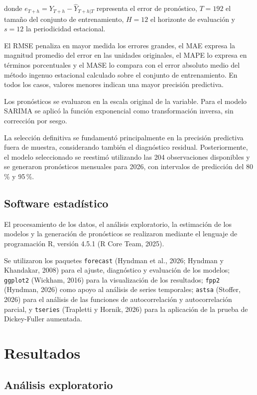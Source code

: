 \documentclass[12pt]{article}
\begin{document}
donde $e_{T+h}=Y_{T+h}-\widehat{Y}_{T+h|T}$ representa 
el error de pronóstico, $T=192$ el tamaño del conjunto 
de entrenamiento, $H=12$ el horizonte de evaluación 
y $s=12$ la periodicidad estacional.

El RMSE penaliza en mayor medida los errores grandes, 
el MAE expresa la magnitud promedio del error en las 
unidades originales, el MAPE lo expresa en términos 
porcentuales y el MASE lo compara con el error absoluto 
medio del método ingenuo estacional calculado sobre 
el conjunto de entrenamiento. En todos los casos, 
valores menores indican una mayor precisión predictiva.

Los pronósticos se evaluaron en la escala original 
de la variable. Para el modelo SARIMA se aplicó la 
función exponencial como transformación inversa, 
sin corrección por sesgo.

La selección definitiva se fundamentó principalmente 
en la precisión predictiva fuera de muestra, considerando 
también el diagnóstico residual. Posteriormente, el 
modelo seleccionado se reestimó utilizando las 204 
observaciones disponibles y se generaron pronósticos 
mensuales para 2026, con intervalos de predicción 
del 80\,\% y 95\,\%.

\subsection{Software estadístico}

El procesamiento de los datos, el análisis exploratorio, 
la estimación de los modelos y la generación de 
pronósticos se realizaron mediante el lenguaje de 
programación R, versión 4.5.1 (R Core Team, 2025).

Se utilizaron los paquetes \texttt{forecast} 
(Hyndman et al., 2026; Hyndman y Khandakar, 2008) 
para el ajuste, diagnóstico y evaluación de los modelos; 
\texttt{ggplot2} (Wickham, 2016) para la visualización 
de los resultados; \texttt{fpp2} (Hyndman, 2026) como 
apoyo al análisis de series temporales; \texttt{astsa} 
(Stoffer, 2026) para el análisis de las funciones de 
autocorrelación y autocorrelación parcial, y 
\texttt{tseries} (Trapletti y Hornik, 2026) para la 
aplicación de la prueba de Dickey-Fuller aumentada.

\section{Resultados}

\subsection{Análisis exploratorio}
\end{document}
